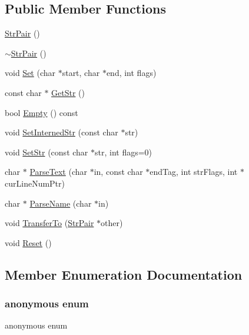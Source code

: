 \subsection*{Public Member Functions}
\begin{DoxyCompactItemize}
\item 
\hyperlink{classtinyxml2_1_1_str_pair_a69153963f7052de9f767d3d8c1623a70}{Str\+Pair} ()
\item 
\hyperlink{classtinyxml2_1_1_str_pair_a60bed84d2503296e1c2a73fcef1431f9}{$\sim$\+Str\+Pair} ()
\item 
void \hyperlink{classtinyxml2_1_1_str_pair_a4f05549373394266a1eecba26813c166}{Set} (char $\ast$start, char $\ast$end, int flags)
\item 
const char $\ast$ \hyperlink{classtinyxml2_1_1_str_pair_ad87e3d11330f5e689ba1e7e54c023b57}{Get\+Str} ()
\item 
bool \hyperlink{classtinyxml2_1_1_str_pair_aca963a7eaa900bfddbea7312f040b39c}{Empty} () const
\item 
void \hyperlink{classtinyxml2_1_1_str_pair_a2baf6230e18333e02ab65d0897ee3941}{Set\+Interned\+Str} (const char $\ast$str)
\item 
void \hyperlink{classtinyxml2_1_1_str_pair_a1f82ec6b5bee35ee7466d8565e43b1de}{Set\+Str} (const char $\ast$str, int flags=0)
\item 
char $\ast$ \hyperlink{classtinyxml2_1_1_str_pair_a68e6999b7677fa711287ececb9ba317e}{Parse\+Text} (char $\ast$in, const char $\ast$end\+Tag, int str\+Flags, int $\ast$cur\+Line\+Num\+Ptr)
\item 
char $\ast$ \hyperlink{classtinyxml2_1_1_str_pair_aa6d8998efceba41d87ec2300c70a6085}{Parse\+Name} (char $\ast$in)
\item 
void \hyperlink{classtinyxml2_1_1_str_pair_a35f795b1557fe5fdcbd93d3cc5d6b939}{Transfer\+To} (\hyperlink{classtinyxml2_1_1_str_pair}{Str\+Pair} $\ast$other)
\item 
void \hyperlink{classtinyxml2_1_1_str_pair_a80c1b3bd99bf62ae85c94a29ce537125}{Reset} ()
\end{DoxyCompactItemize}


\subsection{Member Enumeration Documentation}
\mbox{\label{classtinyxml2_1_1_str_pair_a0301ef962e15dd94574431f1c61266c5}} 
\subsubsection{\texorpdfstring{anonymous enum}{anonymous enum}}
{\footnotesize\ttfamily anonymous enum}

